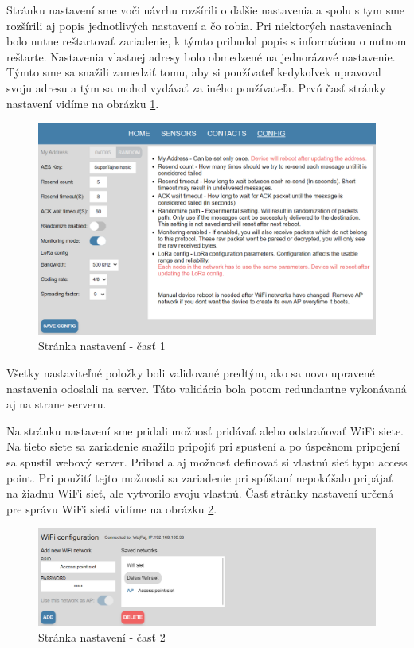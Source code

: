 \documentclass[slovak,master]{diploma}
\begin{document}
Stránku nastavení sme voči návrhu rozšírili o ďalšie nastavenia a spolu s tym sme rozšírili aj popis jednotlivých nastavení a čo robia. 
Pri niektorých nastaveniach bolo nutne reštartovať zariadenie, k týmto pribudol popis s informáciou o nutnom reštarte. 
Nastavenia vlastnej adresy bolo obmedzené na jednorázové nastavenie. Týmto sme sa snažili zamedziť tomu, aby si používateľ kedykoľvek 
upravoval svoju adresu a tým sa mohol vydávať za iného používateľa. Prvú časť stránky nastavení vidíme na obrázku \ref{fig:webConfig1}.
\begin{figure}[h!]
  \centering
  \includegraphics[width=1\textwidth]{Figures/webConfig1.png}
  \caption{Stránka nastavení - časť 1}
  \label{fig:webConfig1}
\end{figure}

\newpage
Všetky nastaviteľné položky boli validované predtým, ako sa novo upravené nastavenia odoslali na server. Táto validácia bola potom redundantne 
vykonávaná aj na strane serveru.

Na stránku nastavení sme pridali možnosť pridávať alebo odstraňovať WiFi siete. Na tieto siete sa zariadenie snažilo pripojiť pri spustení a 
po úspešnom pripojení sa spustil webový server. Pribudla aj možnosť definovať si vlastnú sieť typu access point. Pri použití tejto možnosti sa zariadenie pri spúštaní 
nepokúšalo pripájať na žiadnu WiFi sieť, ale vytvorilo svoju vlastnú. Časť stránky nastavení určená pre správu WiFi sieti vidíme na obrázku \ref{fig:webConfig2}.

\begin{figure}[h!]
  \centering
  \includegraphics[width=1\textwidth]{Figures/webConfig2.png}
  \caption{Stránka nastavení - časť 2}
  \label{fig:webConfig2}
\end{figure}
\end{document}
